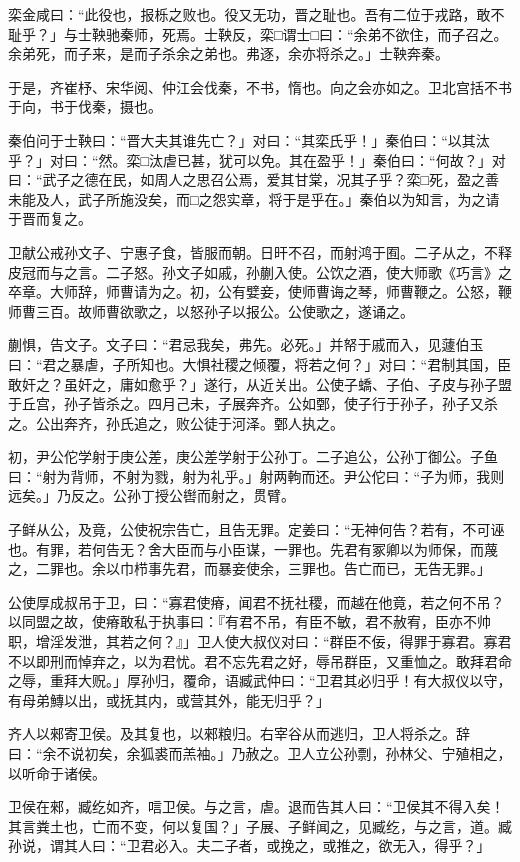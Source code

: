 \documentclass[]{article}
\begin{document}
栾金咸曰：``此役也，报栎之败也。役又无功，晋之耻也。吾有二位于戎路，敢不耻乎？」与士鞅驰秦师，死焉。士鞅反，栾□谓士□曰：``余弟不欲住，而子召之。余弟死，而子来，是而子杀余之弟也。弗逐，余亦将杀之。」士鞅奔秦。

于是，齐崔杼、宋华阅、仲江会伐秦，不书，惰也。向之会亦如之。卫北宫括不书于向，书于伐秦，摄也。

秦伯问于士鞅曰：``晋大夫其谁先亡？」对曰：``其栾氏乎！」秦伯曰：``以其汰乎？」对曰：``然。栾□汰虐已甚，犹可以免。其在盈乎！」秦伯曰：``何故？」对曰：``武子之德在民，如周人之思召公焉，爱其甘棠，况其子乎？栾□死，盈之善未能及人，武子所施没矣，而□之怨实章，将于是乎在。」秦伯以为知言，为之请于晋而复之。

卫献公戒孙文子、宁惠子食，皆服而朝。日旰不召，而射鸿于囿。二子从之，不释皮冠而与之言。二子怒。孙文子如戚，孙蒯入使。公饮之酒，使大师歌《巧言》之卒章。大师辞，师曹请为之。初，公有嬖妾，使师曹诲之琴，师曹鞭之。公怒，鞭师曹三百。故师曹欲歌之，以怒孙子以报公。公使歌之，遂诵之。

蒯惧，告文子。文子曰：``君忌我矣，弗先。必死。」并帑于戚而入，见蘧伯玉曰：``君之暴虐，子所知也。大惧社稷之倾覆，将若之何？」对曰：``君制其国，臣敢奸之？虽奸之，庸如愈乎？」遂行，从近关出。公使子蟜、子伯、子皮与孙子盟于丘宫，孙子皆杀之。四月己未，子展奔齐。公如鄄，使子行于孙子，孙子又杀之。公出奔齐，孙氏追之，败公徒于河泽。鄄人执之。

初，尹公佗学射于庚公差，庚公差学射于公孙丁。二子追公，公孙丁御公。子鱼曰：``射为背师，不射为戮，射为礼乎。」射两軥而还。尹公佗曰：``子为师，我则远矣。」乃反之。公孙丁授公辔而射之，贯臂。

子鲜从公，及竟，公使祝宗告亡，且告无罪。定姜曰：``无神何告？若有，不可诬也。有罪，若何告无？舍大臣而与小臣谋，一罪也。先君有冢卿以为师保，而蔑之，二罪也。余以巾栉事先君，而暴妾使余，三罪也。告亡而已，无告无罪。」

公使厚成叔吊于卫，曰：``寡君使瘠，闻君不抚社稷，而越在他竟，若之何不吊？以同盟之故，使瘠敢私于执事曰：『有君不吊，有臣不敏，君不赦宥，臣亦不帅职，增淫发泄，其若之何？』」卫人使大叔仪对曰：``群臣不佞，得罪于寡君。寡君不以即刑而悼弃之，以为君忧。君不忘先君之好，辱吊群臣，又重恤之。敢拜君命之辱，重拜大贶。」厚孙归，覆命，语臧武仲曰：``卫君其必归乎！有大叔仪以守，有母弟鱄以出，或抚其内，或营其外，能无归乎？」

齐人以郲寄卫侯。及其复也，以郲粮归。右宰谷从而逃归，卫人将杀之。辞曰：``余不说初矣，余狐裘而羔袖。」乃赦之。卫人立公孙剽，孙林父、宁殖相之，以听命于诸侯。

卫侯在郲，臧纥如齐，唁卫侯。与之言，虐。退而告其人曰：``卫侯其不得入矣！其言粪土也，亡而不变，何以复国？」子展、子鲜闻之，见臧纥，与之言，道。臧孙说，谓其人曰：``卫君必入。夫二子者，或挽之，或推之，欲无入，得乎？」
\end{document}
